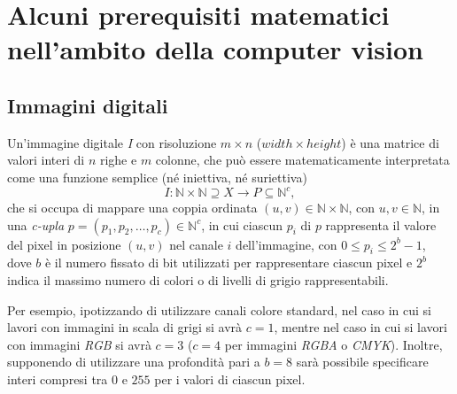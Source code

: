 \chapter{Alcuni prerequisiti matematici nell'ambito della computer vision}
\label{chap:math-prerequisites}


\section{Immagini digitali}
\label{sec:math-images}
Un'immagine digitale \textit{I} con risoluzione $m\times n$ ($width \times height$) \`e una matrice di valori interi di $n$ righe e $m$ colonne, che pu\`o essere matematicamente interpretata come una funzione semplice (n\'e iniettiva, n\'e suriettiva) 
\begin{equation}
	I: \mathbb{N}\times\mathbb{N}\supseteq X \to P\subseteq \mathbb{N}^{c},
	\label{eq:digital-image-function}
\end{equation}
che si occupa di mappare una coppia ordinata $(u,v)\in\mathbb{N}\times\mathbb{N}$, con $u,v\in\mathbb{N}$, in una \textit{c-upla} $p=(p_{1}, p_{2}, \dots, p_{c})\in\mathbb{N}^{c}$, in cui ciascun $p_{i}$ di $p$ rappresenta il valore del pixel in posizione $(u,v)$ nel canale ${i}$ dell'immagine, con $0 \leq p_{i} \leq 2^{b} - 1$, dove $b$ \`e il numero fissato di bit utilizzati per rappresentare ciascun pixel e $2^{b}$ indica il massimo numero di colori o di livelli di grigio rappresentabili.\par
Per esempio, ipotizzando di utilizzare canali colore standard, nel caso in cui si lavori con immagini in scala di grigi si avr\`a $c=1$, mentre nel caso in cui si lavori con immagini \textit{RGB} si avr\`a $c=3$ ($c=4$ per immagini \textit{RGBA} o \textit{CMYK}). Inoltre, supponendo di utilizzare una profondit\`a pari a $b=8$ sar\`a possibile specificare interi compresi tra $0$ e $255$ per i valori di ciascun pixel.



